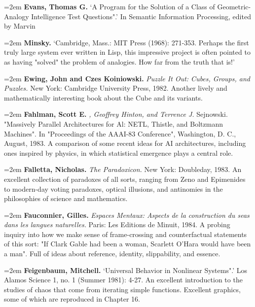 \par\noindent\hangindent=2em {\bf Evans, Thomas G.} `A Program for the Solution of a Class of Geometric-Analogy Intelligence Test Questions".' In Semantic Information Processing, edited by Marvin

\par\noindent\hangindent=2em {\bf Minsky.} `Cambridge, Mass.: MIT Press (1968): 271-353. Perhaps the first truly large system ever written in Lisp, this impressive project is often pointed to as having "solved" the problem of analogies. How far from the truth that is!' 

\par\noindent\hangindent=2em {\bf Ewing, John and Czes Koiniowski.} {\it Puzzle It Out: Cubes, Groups, and Puzzles.} New York: Cambridge University Press, 1982. Another lively and mathematically interesting book about the Cube and its variants.

\par\noindent\hangindent=2em {\bf Fahlman, Scott E.} {\it , Geoffrey Hinton, and Terrence J.} Sejnowski. "Massively Parallel Architectures for Al: NETL, Thistle, and Boltzmann Machines". In "Proceedings of the AAAI-83 Conference", Washington, D. C., August, 1983. A comparison of some recent ideas for AI architectures, including ones inspired by physics, in which statistical emergence plays a central role.

\par\noindent\hangindent=2em {\bf Falletta, Nicholas.} {\it The Paradoxicon.} New York: Doubleday, 1983. An excellent collection of paradoxes of all sorts, ranging from Zeno and Epimenides to modern-day voting paradoxes, optical illusions, and antinomies in the philosophies of science and mathematics.

\par\noindent\hangindent=2em {\bf Fauconnier, Gilles.} {\it Espaces Mentaux: Aspects de la construction du seas dans les langues naturelles.} Paris: Les Editions de Minuit, 1984. A probing inquiry into how we make sense of frame-crossing and counterfactual statements of this sort: "If Clark Gable had been a woman, Scarlett O'Hara would have been a man". Full of ideas about reference, identity, slippability, and essence.

\par\noindent\hangindent=2em {\bf Feigenbaum, Mitchell.} `Universal Behavior in Nonlinear Systems".' Los Alamos Science 1, no. 1 (Summer 1981): 4-27. An excellent introduction to the studies of chaos that come from iterating simple functions. Excellent graphics, some of which are reproduced in Chapter 16.

